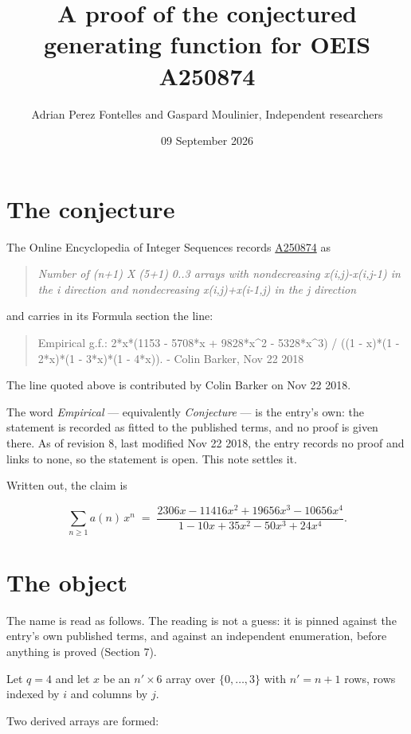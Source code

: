 \documentclass[11pt]{article}
\title{A proof of the conjectured generating function for OEIS A250874}
\author{Adrian Perez Fontelles and Gaspard Moulinier, Independent researchers}
\date{09 September 2026}
\theoremstyle{definition}
\begin{document}
\maketitle
\section{The conjecture}

The Online Encyclopedia of Integer Sequences records \href{https://oeis.org/A250874}{A250874} as

\begin{quote}\itshape Number of (n+1) X (5+1) 0..3 arrays with nondecreasing x(i,j)-x(i,j-1) in the i direction and nondecreasing x(i,j)+x(i-1,j) in the j direction\end{quote}

and carries in its Formula section the line:

\begin{quote}\ttfamily Empirical g.f.: 2*x*(1153 - 5708*x + 9828*x\textasciicircum{}2 - 5328*x\textasciicircum{}3) / ((1 - x)*(1 - 2*x)*(1 - 3*x)*(1 - 4*x)). - Colin Barker, Nov 22 2018\end{quote}

The line quoted above is contributed by Colin Barker on Nov 22 2018.

The word {\itshape Empirical} --- equivalently {\itshape Conjecture} --- is the entry's own: the statement is recorded as fitted to the published terms, and no proof is given there. As of revision 8, last modified Nov 22 2018, the entry records no proof and links to none, so the statement is open. This note settles it.

Written out, the claim is

\[\sum_{n \ge 1} a(n)\,x^n \;=\; \frac{2306x - 11416x^{2} + 19656x^{3} - 10656x^{4}}{1 - 10x + 35x^{2} - 50x^{3} + 24x^{4}}.\]

\section{The object}

The name is read as follows. The reading is not a guess: it is pinned against the entry's own published terms, and against an independent enumeration, before anything is proved (Section 7).

Let $q = 4$ and let $x$ be an $n' \times 6$ array over $\{0,\dots,3\}$ with $n' = n + 1$ rows, rows indexed by $i$ and columns by $j$.

Two derived arrays are formed:
\end{document}
